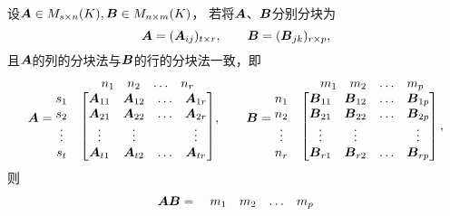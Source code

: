 \begin{enumerate}
	设\(\boldsymbol{A}\in M_{s \times n}(K),
	\boldsymbol{B}\in M_{n \times m}(K)\)，
	若将\(\boldsymbol{A}\)、\(\boldsymbol{B}\)分别分块为\begin{equation*}
		\boldsymbol{A}=(\boldsymbol{A}_{ij})_{t \times r}, \qquad
		\boldsymbol{B}=(\boldsymbol{B}_{jk})_{r \times p},
	\end{equation*}
	且\(\boldsymbol{A}\)的列的分块法与\(\boldsymbol{B}\)的行的分块法一致，即\begin{equation*}
		\boldsymbol{A} = \begin{matrix}
			& \begin{matrix} n_1 & n_2 & \dots & n_r \end{matrix} \\
			\begin{matrix} s_1 \\ s_2 \\ \vdots \\ s_t \end{matrix} & \begin{bmatrix}
			\boldsymbol{A}_{11} & \boldsymbol{A}_{12} & \dots & \boldsymbol{A}_{1r} \\
			\boldsymbol{A}_{21} & \boldsymbol{A}_{22} & \dots & \boldsymbol{A}_{2r} \\
			\vdots & \vdots & & \vdots \\
			\boldsymbol{A}_{t1} & \boldsymbol{A}_{t2} & \dots & \boldsymbol{A}_{tr}
			\end{bmatrix}
		\end{matrix},
		\qquad
		\boldsymbol{B} = \begin{matrix}
			& \begin{matrix} m_1 & m_2 & \dots & m_p \end{matrix} \\
			\begin{matrix} n_1 \\ n_2 \\ \vdots \\ n_r \end{matrix} & \begin{bmatrix}
			\boldsymbol{B}_{11} & \boldsymbol{B}_{12} & \dots & \boldsymbol{B}_{1p} \\
			\boldsymbol{B}_{21} & \boldsymbol{B}_{22} & \dots & \boldsymbol{B}_{2p} \\
			\vdots & \vdots & & \vdots \\
			\boldsymbol{B}_{r1} & \boldsymbol{B}_{r2} & \dots & \boldsymbol{B}_{rp}
			\end{bmatrix},
		\end{matrix}
	\end{equation*}
	则\begin{equation*}
		\boldsymbol{A}\boldsymbol{B} = \begin{matrix}
			& \begin{matrix} m_1 & m_2 & \dots & m_p \end{matrix} \\

\end{matrix}
\end{equation*}
\end{enumerate}
